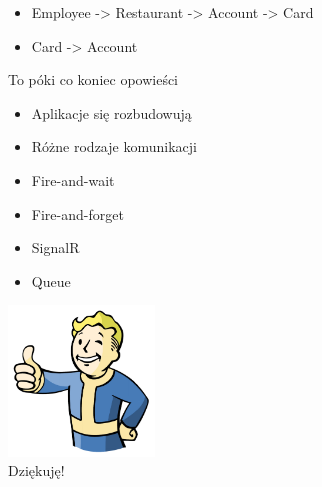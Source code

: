 \documentclass{beamer}
\begin{document}
\begin{frame}{}
	\begin{huge}
		\begin{itemize}[<+->]
			\item Employee -> Restaurant -> Account -> Card
			\item Card -> Account
		\end{itemize}
	\end{huge}
\end{frame}


\begin{frame}{}
	\begin{center}
		\Huge{To póki co koniec opowieści}
	\end{center}
\end{frame}

\begin{frame}{}
	\begin{huge}
		\begin{itemize}[<+->]
			\item Aplikacje się rozbudowują
			\item Różne rodzaje komunikacji
		\end{itemize}
	\end{huge}
\end{frame}

\begin{frame}{}
	\begin{huge}
		\begin{itemize}[<+->]
			\item Fire-and-wait
			\item Fire-and-forget
			\item SignalR
			\item Queue
		\end{itemize}
	\end{huge}
\end{frame}

\begin{frame}{}
	\begin{center}
  		\includegraphics[height=4cm]{ok.png} \\
		\Huge{Dziękuję!}
	\end{center}
\end{frame}
\end{document}
